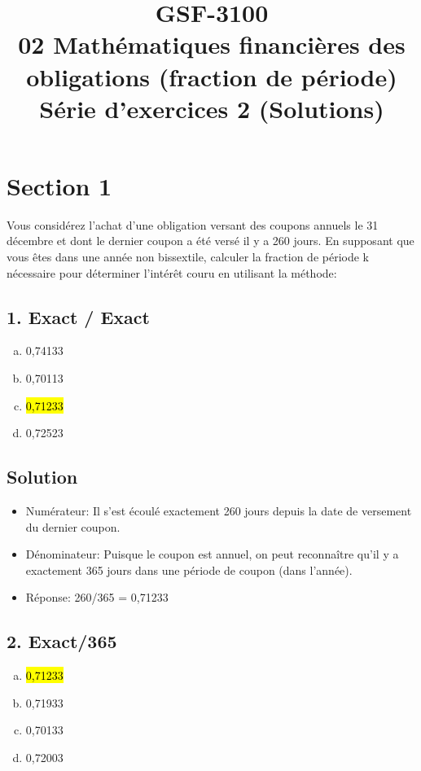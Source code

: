 \documentclass[10pt,a4paper]{article}
\title{GSF-3100 \\
02 Mathématiques financières des obligations (fraction de période) \\
Série d'exercices 2 (Solutions)}
\begin{document}
\maketitle


\newpage

\section*{Section 1}
Vous considérez l’achat d’une obligation versant des coupons annuels le 31 décembre et dont le dernier coupon a été versé il y a 260 jours.  En supposant que vous êtes dans une année non bissextile, calculer la fraction de période k nécessaire pour déterminer l’intérêt couru en utilisant la méthode:

\subsection*{1.  Exact / Exact} 
\begin{enumerate}[a)]
\item 0,74133
\item 0,70113
\item \hl{0,71233}
\item 0,72523
\end{enumerate}

\subsection*{Solution}
\begin{itemize}
\item Numérateur: Il s'est écoulé exactement 260 jours depuis la date de versement du dernier coupon.

\item Dénominateur: Puisque le coupon est annuel, on peut reconnaître qu'il y a exactement 365 jours dans une période de coupon (dans l'année).

\item Réponse: 260/365 = 0,71233
\end{itemize}

\newpage

\subsection*{2.  Exact/365} 
\begin{enumerate}[a)]
\item \hl{0,71233}
\item 0,71933
\item 0,70133
\item 0,72003
\end{enumerate}
\end{document}
